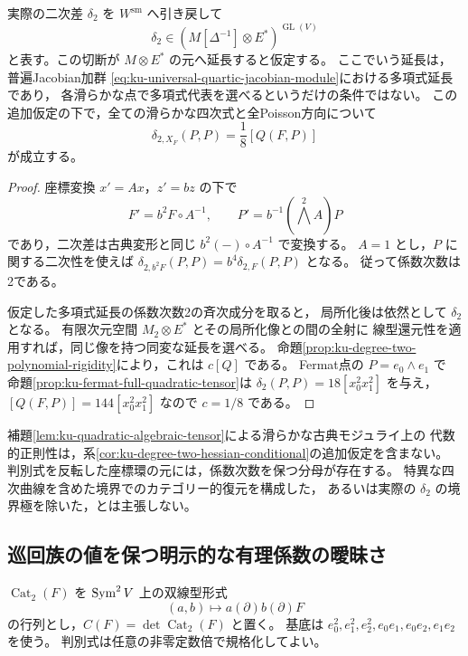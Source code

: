 \begin{corollary}[判別式境界へ多項式延長できる場合の二次差]
\label{cor:ku-degree-two-hessian-conditional}
実際の二次差 $\delta_2$ を $W^{\mathrm{sm}}$ へ引き戻して
\[
 \delta_2\in(M[\Delta^{-1}]\otimes E^*)^{\operatorname{GL}(V)}
\]
と表す。この切断が $M\otimes E^*$ の元へ延長すると仮定する。
ここでいう延長は，普遍Jacobian加群
\eqref{eq:ku-universal-quartic-jacobian-module}における多項式延長であり，
各滑らかな点で多項式代表を選べるというだけの条件ではない。
この追加仮定の下で，全ての滑らかな四次式と全Poisson方向について
\begin{equation}\label{eq:ku-degree-two-hessian-conditional}
 \delta_{2,X_F}(P,P)=\frac18[Q(F,P)]
\end{equation}
が成立する。
\end{corollary}
\begin{proof}
座標変換 $x'=Ax$，$z'=bz$ の下で
\[
 F'=b^2F\circ A^{-1},\qquad
 P'=b^{-1}(\bigwedge^2A)P
\]
であり，二次差は古典変形と同じ $b^2(-)\circ A^{-1}$ で変換する。
$A=1$ とし，$P$ に関する二次性を使えば
$\delta_{2,b^2F}(P,P)=b^4\delta_{2,F}(P,P)$ となる。
従って係数次数は2である。

仮定した多項式延長の係数次数2の斉次成分を取ると，
局所化後は依然として $\delta_2$ となる。
有限次元空間 $M_2\otimes E^*$ とその局所化像との間の全射に
線型還元性を適用すれば，同じ像を持つ同変な延長を選べる。
命題\ref{prop:ku-degree-two-polynomial-rigidity}により，これは $c[Q]$ である。
Fermat点の $P=e_0\wedge e_1$ で
命題\ref{prop:ku-fermat-full-quadratic-tensor}は
$\delta_2(P,P)=18[x_0^2x_1^2]$ を与え，
$[Q(F,P)]=144[x_0^2x_1^2]$ なので $c=1/8$ である。
\end{proof}

\begin{remark}[延長条件の状態]
\label{rem:ku-polynomial-extension-open}
補題\ref{lem:ku-quadratic-algebraic-tensor}による滑らかな古典モジュライ上の
代数的正則性は，系\ref{cor:ku-degree-two-hessian-conditional}の追加仮定を含まない。
判別式を反転した座標環の元には，係数次数を保つ分母が存在する。
特異な四次曲線を含めた境界でのカテゴリー的復元を構成した，
あるいは実際の $\delta_2$ の境界極を除いた，とは主張しない。
\end{remark}

\subsection{巡回族の値を保つ明示的な有理係数の曖昧さ}

$\operatorname{Cat}_2(F)$ を $\operatorname{Sym}^2V$ 上の双線型形式
\[
 (a,b)\longmapsto a(\partial)b(\partial)F
\]
の行列とし，$C(F)=\det\operatorname{Cat}_2(F)$ と置く。
基底は $e_0^2,e_1^2,e_2^2,e_0e_1,e_0e_2,e_1e_2$ を使う。
判別式は任意の非零定数倍で規格化してよい。

